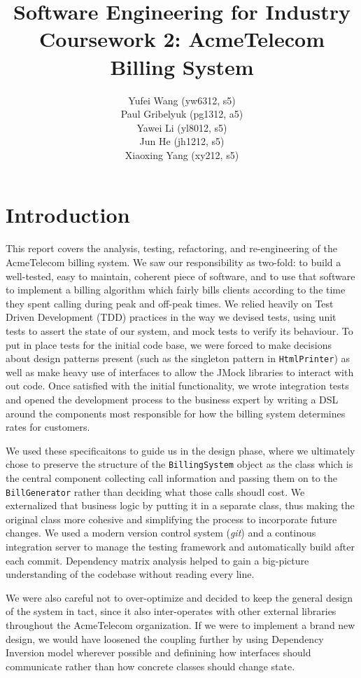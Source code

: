 \documentclass[a4paper,12pt,oneside,final]{article}
\author{
    Yufei Wang (yw6312, s5) \\ 
    Paul Gribelyuk (pg1312, a5) \\
    Yawei Li (yl8012, s5) \\ 
    Jun He (jh1212, s5) \\
    Xiaoxing Yang (xy212, s5)
}
\title{\Huge Software Engineering for Industry \\ Coursework 2: AcmeTelecom Billing System}
\begin{document}
\maketitle

\section{Introduction} %
This report covers the analysis, testing, refactoring, and re-engineering of the AcmeTelecom billing system.  We saw our responsibility as two-fold: to build a well-tested, easy to maintain, coherent piece of software, and to use that software to implement a billing algorithm which fairly bills clients according to the time they spent calling during peak and off-peak times.  We relied heavily on Test Driven Development (TDD) practices in the way we devised tests, using unit tests to assert the state of our system, and mock tests to verify its behaviour.  To put in place tests for the initial code base, we were forced to make decisions about design patterns present (such as the singleton pattern in \verb+HtmlPrinter+) as well as make heavy use of interfaces to allow the JMock libraries to interact with out code.  Once satisfied with the initial functionality, we wrote integration tests and opened the development process to the business expert by writing a DSL around the components most responsible for how the billing system determines rates for customers.

We used these specificaitons to guide us in the design phase, where we ultimately chose to preserve the structure of the \verb+BillingSystem+ object as the class which is the central component collecting call information and passing them on to the \verb+BillGenerator+ rather than deciding what those calls shoudl cost.  We externalized that business logic by putting it in a separate class, thus making the original class more cohesive and simplifying the process to incorporate future changes.  We used a modern version control system (\emph{git}) and a continous integration server to manage the testing framework and automatically build after each commit.  Dependency matrix analysis helped to gain a big-picture understanding of the codebase without reading every line.

We were also careful not to over-optimize and decided to keep the general design of the system in tact, since it also inter-operates with other external libraries throughout the AcmeTelecom organization.  If we were to implement a brand new design, we would have loosened the coupling further by using Dependency Inversion model wherever possible and definining how interfaces should communicate rather than how concrete classes should change state.
	
\end{document}
